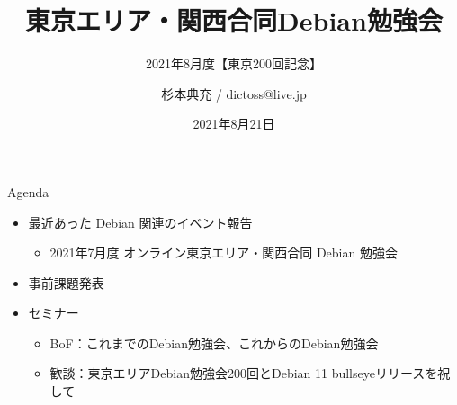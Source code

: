\title{東京エリア・関西合同Debian勉強会}
\subtitle{2021年8月度【東京200回記念】} %
\author{杉本典充 / dictoss@live.jp}
\date{2021年8月21日}



\begin{frame}
\titlepage{}
\end{frame}

\begin{frame}{Agenda}
 \begin{minipage}[t]{0.45\hsize}
  \begin{itemize}
  \item 最近あった Debian 関連のイベント報告
    \begin{itemize}
    \item 2021年7月度 オンライン東京エリア・関西合同 Debian 勉強会
    \end{itemize}
  \item 事前課題発表
  \end{itemize}
 \end{minipage}
 \begin{minipage}[t]{0.45\hsize}
   \begin{itemize}
   \item セミナー
     \begin{itemize}
      \item BoF：これまでのDebian勉強会、これからのDebian勉強会
      \item 歓談：東京エリアDebian勉強会200回とDebian 11 bullseyeリリースを祝して
     \end{itemize}
  \end{itemize}
 \end{minipage}
\end{frame}

